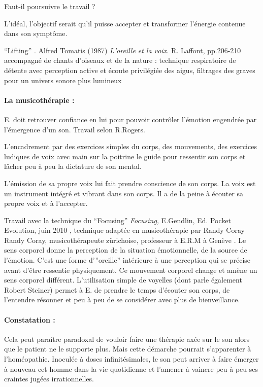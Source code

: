 \documentclass[12pt,french]{report}
\makeatletter
\let\SF@@footnote\footnote
\def\footnote{\ifx\protect\@typeset@protect
    \expandafter\SF@@footnote
  \else
    \expandafter\SF@gobble@opt
  \fi
}
\edef\SF@gobble@opt{\noexpand\protect
  \expandafter\noexpand\csname SF@gobble@opt \endcsname}
\makeatother
\begin{document}
Faut-il poursuivre le travail ?

L'idéal, l'objectif serait qu'il puisse accepter et  transformer l'énergie
contenue dans son symptôme.

``Lifting'' .\footnote{Alfred Tomatis (1987) \emph{L'oreille et la voix. }R. Laffont, pp.206-210 }accompagné
de chants d'oiseaux et de la nature : technique respiratoire de détente
avec perception active et écoute privilégiée des aigus, filtrages
des graves pour un univers sonore plus lumineux

\paragraph{La musicothérapie : }

E. doit retrouver confiance en lui pour pouvoir contrôler l'émotion
engendrée par l'émergence d'un son. Travail selon R.Rogers. 

L'encadrement par des exercices simples du corps, des mouvements,
des exercices ludiques de voix avec main sur la poitrine le guide
pour ressentir son corps et lâcher peu à peu la dictature de son mental.

L'émission de sa propre voix lui fait prendre conscience de son corps.
La voix est un instrument intégré et vibrant dans son corps. Il a
de la peine à écouter sa propre voix et à l'accepter.

Travail avec la technique du ``Focusing'' \footnote{\emph{Focusing, }E.Gendlin, Ed. Pocket Evolution, juin 2010 }
, technique adaptée en musicothérapie par Randy Coray\footnote{Randy Coray, musicothérapeute zürichoise, professeur à E.R.M à Genève}
. Le sens corporel donne la perception de la situation émotionnelle,
de la source de l'émotion. C'est une forme d'{}''oreille'' intérieure
à une perception qui se précise avant d'être ressentie physiquement.
Ce mouvement corporel change et amène un sens corporel différent.
L'utilisation simple de voyelles (dont parle également Robert Steiner)
permet à E. de prendre le temps d'écouter son corps, de l'entendre
résonner et peu à peu de se considérer avec plus de bienveillance.

\paragraph{Constatation : }

Cela peut paraître paradoxal de vouloir faire une thérapie axée sur
le son alors que le patient ne le supporte plus. Mais cette démarche
pourrait s'apparenter à l'homéopathie. Inoculée à doses infinitésimales,
le son peut arriver à faire émerger à nouveau cet homme dans la vie
quotidienne et l'amener à vaincre peu à peu ses craintes jugées irrationnelles.
\end{document}
